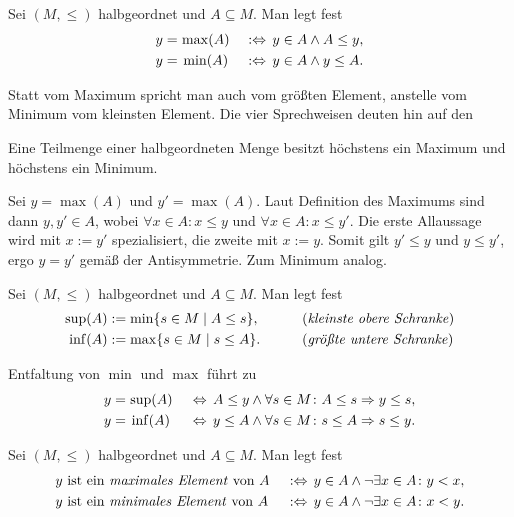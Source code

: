 \begin{Definition}\label{def:max-min}\newlinefirst
Sei $(M,\le)$ halbgeordnet und $A\subseteq M$. Man legt fest
\begin{alignat*}{3}
y = &\hspace{1.4pt}\max(A)\,\,&:\Leftrightarrow\, y\in A\land A\le y,\\
y = &\hspace{2.4pt}\min(A)\,\,&:\Leftrightarrow\, y\in A\land y\le A.
\end{alignat*}
\end{Definition}

\noindent
Statt vom Maximum spricht man auch vom größten Element,
anstelle vom Minimum vom kleinsten Element. Die vier Sprechweisen
deuten hin auf den

\begin{Satz}
Eine Teilmenge einer halbgeordneten Menge besitzt höchstens ein Maximum
und höchstens ein Minimum.
\end{Satz}
\begin{Beweis}
Sei $y=\max(A)$ und $y'=\max(A)$. Laut Definition des
Maximums sind dann $y,y'\in A$, wobei $\forall x\in A\colon x\le y$
und $\forall x\in A\colon x\le y'$. Die erste Allaussage wird
mit $x:=y'$ spezialisiert, die zweite mit $x:=y$. Somit
gilt $y'\le y$ und $y\le y'$, ergo $y=y'$ gemäß der Antisymmetrie.
Zum Minimum analog.\,\qedsymbol
\end{Beweis}

\begin{Definition}\newlinefirst
Sei $(M,\le)$ halbgeordnet und $A\subseteq M$. Man legt fest
\begin{alignat*}{2}
\sup(A) &:= \min\{s\in M\mid A\le s\},&&\qquad\text{(\emph{kleinste obere Schranke})}\\
\inf(A) &:= \max\{s\in M\mid s\le A\}.&&\qquad\text{(\emph{größte untere Schranke})}
\end{alignat*}
\end{Definition}
Entfaltung von $\min$ und $\max$ führt zu
\begin{alignat*}{2}
y = &\hspace{1.4pt}\sup(A)\, &&\Leftrightarrow\, A\le y\land\forall s\in M\colon A\le s\Rightarrow y\le s,\\
y = &\hspace{2.4pt}\inf(A)\, &&\Leftrightarrow\, y\le A\land\forall s\in M\colon s\le A\Rightarrow s\le y.
\end{alignat*}

\begin{Definition}%
\label{def:minimales-Element}\newlinefirst
Sei $(M,\le)$ halbgeordnet und $A\subseteq M$. Man legt fest
\begin{alignat*}{2}
&\text{$y$ ist ein \emph{maximales Element} von $A$}\,&&:\Leftrightarrow\,
  y\in A\land\lnot\exists x\in A\colon y<x,\\
&\text{$y$ ist ein \emph{minimales Element} von $A$}\,&&:\Leftrightarrow\,
  y\in A\land\lnot\exists x\in A\colon x<y.
\end{alignat*}
\end{Definition}

